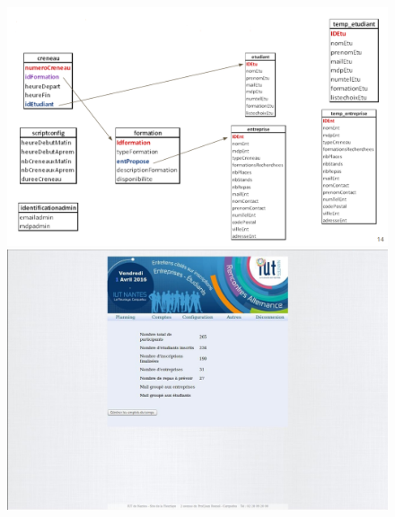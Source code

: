 \documentclass[12pt,a4paper]{article}
\begin{document}
\begin{figure}
  \centering
  \includegraphics[scale=0.38]{figure12(3_4).png}
  \includegraphics[scale=0.4]{figure7(3_2).jpg}
\end{figure}
\end{document}
